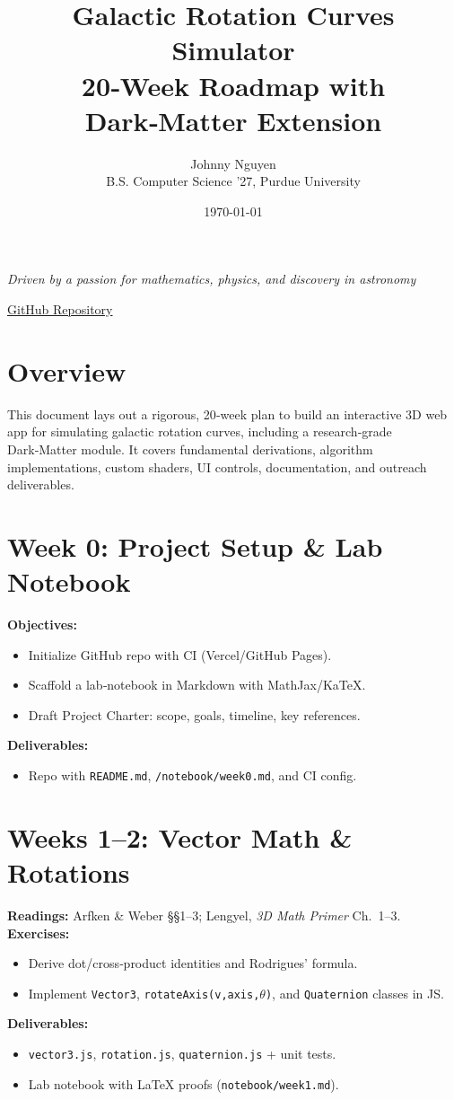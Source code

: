 \documentclass[11pt]{article}
\title{\bfseries Galactic Rotation Curves Simulator\\\Large 20‑Week Roadmap with Dark‑Matter Extension}
\author{Johnny Nguyen \\ \small B.S. Computer Science ’27, Purdue University}
\date{\today}
\begin{document}
\maketitle
\begin{center}
  \textit{Driven by a passion for mathematics, physics, and discovery in astronomy}
\end{center}
\begin{center}
  \href{https://github.com/jnguyen727/galactic-rotation-curves}{GitHub Repository} \quad\textbullet\quad
\end{center}

\tableofcontents
\newpage

\section{Overview}
This document lays out a rigorous, 20‑week plan to build an interactive 3D web app for simulating galactic rotation curves, including a research‑grade Dark‑Matter module.  It covers fundamental derivations, algorithm implementations, custom shaders, UI controls, documentation, and outreach deliverables.

\section{Week 0: Project Setup \& Lab Notebook}
\textbf{Objectives:}
\begin{itemize}
  \item Initialize GitHub repo with CI (Vercel/GitHub Pages).
  \item Scaffold a lab‑notebook in Markdown with MathJax/KaTeX.
  \item Draft Project Charter: scope, goals, timeline, key references.
\end{itemize}
\textbf{Deliverables:}
\begin{itemize}
  \item Repo with \texttt{README.md}, \texttt{/notebook/week0.md}, and CI config.
\end{itemize}

\section{Weeks 1--2: Vector Math \& Rotations}
\textbf{Readings:} Arfken \& Weber §§1–3; Lengyel, \emph{3D Math Primer} Ch.~1–3.  
\textbf{Exercises:}
\begin{itemize}
  \item Derive dot/cross‑product identities and Rodrigues' formula.
  \item Implement \texttt{Vector3}, \texttt{rotateAxis(v,axis,\(\theta\))}, and \texttt{Quaternion} classes in JS.
\end{itemize}
\textbf{Deliverables:}
\begin{itemize}
  \item \texttt{vector3.js}, \texttt{rotation.js}, \texttt{quaternion.js} + unit tests.
  \item Lab notebook with LaTeX proofs (\texttt{notebook/week1.md}).
\end{itemize}
\end{document}
